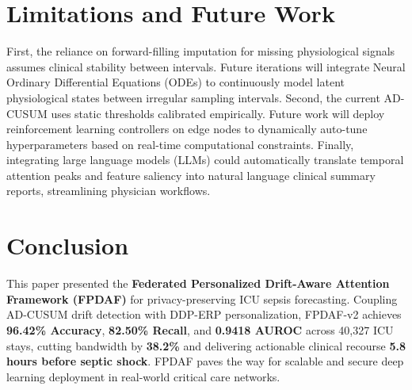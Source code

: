 \documentclass{llncs}
\begin{document}
\section{Limitations and Future Work}
\label{sec:limitations}

First, the reliance on forward-filling imputation for missing physiological signals assumes clinical stability between intervals. Future iterations will integrate Neural Ordinary Differential Equations (ODEs) to continuously model latent physiological states between irregular sampling intervals. Second, the current AD-CUSUM uses static thresholds calibrated empirically. Future work will deploy reinforcement learning controllers on edge nodes to dynamically auto-tune hyperparameters based on real-time computational constraints. Finally, integrating large language models (LLMs) could automatically translate temporal attention peaks and feature saliency into natural language clinical summary reports, streamlining physician workflows.

\section{Conclusion}
\label{sec:conclusion}
This paper presented the \textbf{Federated Personalized Drift-Aware Attention Framework (FPDAF)} for privacy-preserving ICU sepsis forecasting. Coupling AD-CUSUM drift detection with DDP-ERP personalization, FPDAF-v2 achieves \textbf{96.42\% Accuracy}, \textbf{82.50\% Recall}, and \textbf{0.9418 AUROC} across 40,327 ICU stays, cutting bandwidth by \textbf{38.2\%} and delivering actionable clinical recourse \textbf{5.8 hours before septic shock}. FPDAF paves the way for scalable and secure deep learning deployment in real-world critical care networks.

\clearpage


\end{document}
